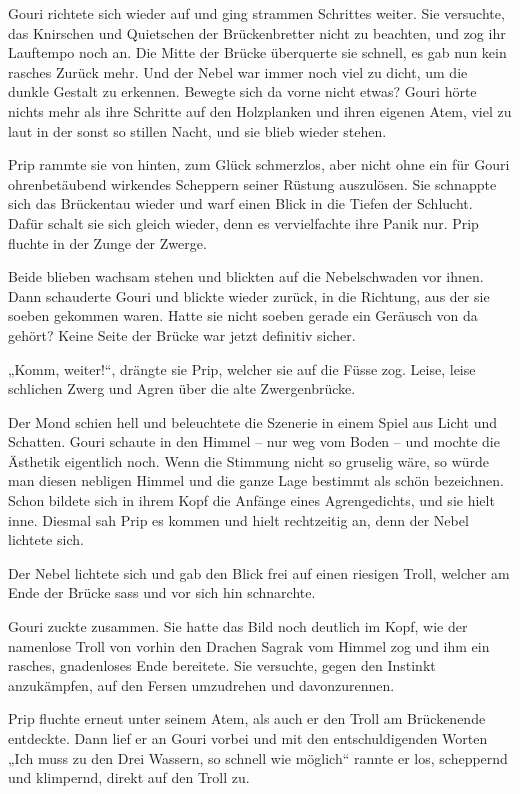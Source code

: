 Gouri richtete sich wieder auf und ging strammen Schrittes weiter. Sie versuchte, das Knirschen und Quietschen der Brückenbretter nicht zu beachten, und zog ihr Lauftempo noch an. Die Mitte der Brücke überquerte sie schnell, es gab nun kein rasches Zurück mehr. Und der Nebel war immer noch viel zu dicht, um die dunkle Gestalt zu erkennen. Bewegte sich da vorne nicht etwas? Gouri hörte nichts mehr als ihre Schritte auf den Holzplanken und ihren eigenen Atem, viel zu laut in der sonst so stillen Nacht, und sie blieb wieder stehen.

Prip rammte sie von hinten, zum Glück schmerzlos, aber nicht ohne ein für Gouri ohrenbetäubend wirkendes Scheppern seiner Rüstung auszulösen. Sie schnappte sich das Brückentau wieder und warf einen Blick in die Tiefen der Schlucht. Dafür schalt sie sich gleich wieder, denn es vervielfachte ihre Panik nur. Prip fluchte in der Zunge der Zwerge.

Beide blieben wachsam stehen und blickten auf die Nebelschwaden vor ihnen. Dann schauderte Gouri und blickte wieder zurück, in die Richtung, aus der sie soeben gekommen waren. Hatte sie nicht soeben gerade ein Geräusch von da gehört? Keine Seite der Brücke war jetzt definitiv sicher.

„Komm, weiter!“, drängte sie Prip, welcher sie auf die Füsse zog. Leise, leise schlichen Zwerg und Agren über die alte Zwergenbrücke.

Der Mond schien hell und beleuchtete die Szenerie in einem Spiel aus Licht und Schatten. Gouri schaute in den Himmel – nur weg vom Boden – und mochte die Ästhetik eigentlich noch. Wenn die Stimmung nicht so gruselig wäre, so würde man diesen nebligen Himmel und die ganze Lage bestimmt als schön bezeichnen. Schon bildete sich in ihrem Kopf die Anfänge eines Agrengedichts, und sie hielt inne. Diesmal sah Prip es kommen und hielt rechtzeitig an, denn der Nebel lichtete sich.

Der Nebel lichtete sich und gab den Blick frei auf einen riesigen Troll, welcher am Ende der Brücke sass und vor sich hin schnarchte.

Gouri zuckte zusammen. Sie hatte das Bild noch deutlich im Kopf, wie der namenlose Troll von vorhin den Drachen Sagrak vom Himmel zog und ihm ein rasches, gnadenloses Ende bereitete. Sie versuchte, gegen den Instinkt anzukämpfen, auf den Fersen umzudrehen und davonzurennen.

Prip fluchte erneut unter seinem Atem, als auch er den Troll am Brückenende entdeckte. Dann lief er an Gouri vorbei und mit den entschuldigenden Worten „Ich muss zu den Drei Wassern, so schnell wie möglich“ rannte er los, scheppernd und klimpernd, direkt auf den Troll zu.


